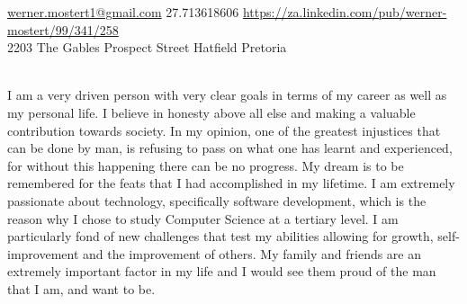 

\sloppy  %



\nobreakvspace{0.3em}  %

\noindent\href{mailto:werner.dot.mostert1.at.gmail.dot.com}{werner.mostert1\mbox{}@\mbox{}gmail.com}\sbull
\textsmaller{+}27.713618606\sbull
\href{https://za.linkedin.com/pub/werner-mostert/99/341/258}{https://za.linkedin.com/pub/werner-mostert/99/341/258}
\\
2203 The Gables Prospect Street\sbull
Hatfield\sbull
Pretoria\\

\spacedhrule{0.9em}{-0.4em}  %
\begin{center}
\end{center}


\vspace{-1.3em}  %
\begin{multicols}{3}%

\noindent {}\\I am a very driven person with very clear goals in terms of my career as well as my personal life. I believe in honesty above all else and making a valuable contribution towards society. In my opinion, one of the greatest injustices that can be done by man, is refusing to pass on what one has learnt and experienced, for without this happening there can be no progress. My dream is to be remembered for the feats that I had accomplished in my lifetime. I am extremely passionate about technology, specifically software development, which is the reason why I chose to study Computer Science at a tertiary level. I am particularly fond of new challenges that test my abilities allowing for growth, self-improvement and the improvement of others. My family and friends are an extremely important factor in my life and I would see them proud of the man that I am, and want to be. 

\end{multicols}

\spacedhrule{0em}{-0.4em}



